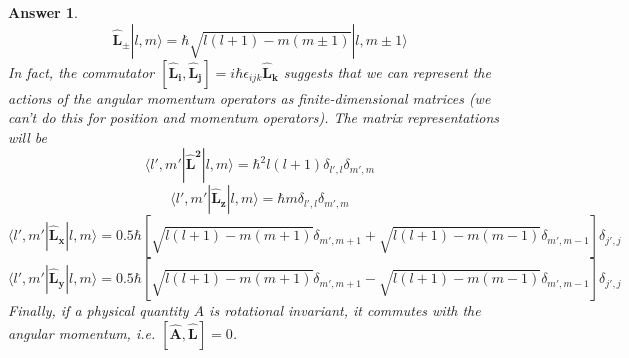 \documentclass[a4paper]{article}
\newtheorem{ans}{Answer}[subsection]
\theoremstyle{new}
\begin{document}
\begin{ans}
$$\mathbf{\hat{L}_\pm}|l,m\rangle=\hbar\sqrt{l(l+1)-m(m\pm1)}|l,m\pm1\rangle$$
In fact, the commutator $[\mathbf{\hat{L}_i},\mathbf{\hat{L}_j}]=i\hbar\epsilon_{ijk}\mathbf{\hat{L}_k}$ suggests that we can represent the actions of the angular momentum operators as finite-dimensional matrices (we can't do this for position and momentum operators). The matrix representations will be $$\langle l',m'|\mathbf{\hat{L}^2}|l,m\rangle=\hbar^2l(l+1)\delta_{l',l}\delta_{m',m}$$
$$\langle l',m'|\mathbf{\hat{L}_z}|l,m\rangle=\hbar m\delta_{l',l}\delta_{m',m}$$
$$\langle l',m'|\mathbf{\hat{L}_x}|l,m\rangle=0.5\hbar[\sqrt{l(l+1)-m(m+1)}\delta_{m',m+1}+\sqrt{l(l+1)-m(m-1)}\delta_{m',m-1}]\delta_{j',j}$$
$$\langle l',m'|\mathbf{\hat{L}_y}|l,m\rangle=0.5\hbar[\sqrt{l(l+1)-m(m+1)}\delta_{m',m+1}-\sqrt{l(l+1)-m(m-1)}\delta_{m',m-1}]\delta_{j',j}$$
Finally, if a physical quantity $A$ is rotational invariant, it commutes with the angular momentum, i.e. $[\mathbf{\hat{A}},\mathbf{\hat{L}}]=0$.

\end{ans}
\end{document}
